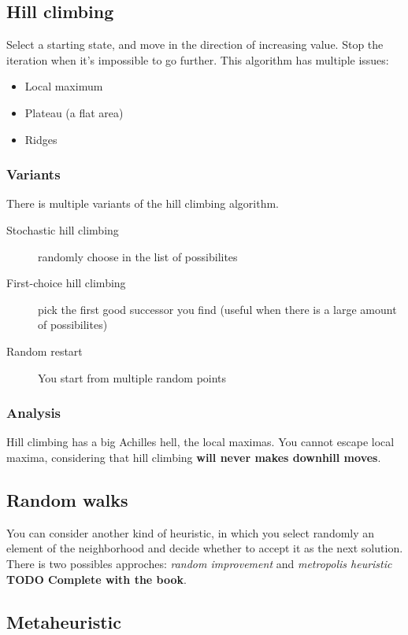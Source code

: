 \subsection{Hill climbing}

Select a starting state, and move in the direction of increasing value. Stop the iteration when it's impossible to go further. This algorithm has multiple issues:
\begin{itemize}
\item Local maximum
\item Plateau (a flat area)
\item Ridges
\end{itemize}

\subsubsection{Variants}

There is multiple variants of the hill climbing algorithm.
\begin{description}
\item[Stochastic hill climbing] randomly choose in the list of possibilites
\item[First-choice hill climbing] pick the first good successor you find (useful when there is a large amount of possibilites)
\item[Random restart] You start from multiple random points
\end{description}

\subsubsection{Analysis}

Hill climbing has a big Achilles hell, the local maximas. You cannot escape local maxima, considering that hill climbing \textbf{will never makes downhill moves}.

\subsection{Random walks}

You can consider another kind of heuristic, in which you select randomly an element of the neighborhood and decide whether to accept it as the next solution. There is two possibles approches: \textit{random improvement} and \textit{metropolis heuristic} \textbf{TODO Complete with the book}.

\subsection{Metaheuristic}

